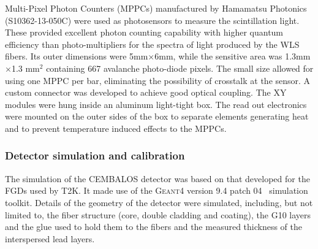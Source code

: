 Multi-Pixel Photon Counters (MPPCs) manufactured by Hamamatsu Photonics (S10362-13-050C) were used as photosensors to measure the scintillation light. These provided excellent photon counting capability with higher quantum efficiency than photo-multipliers for the spectra of light produced by the WLS fibers. Its outer dimensions were 5mm$\times$6mm, while the sensitive area was 1.3mm$\times$1.3 mm$^2$ containing 667 avalanche photo-diode pixels. The small size allowed for using one MPPC per bar, eliminating the possibility of crosstalk at the sensor. A custom connector was developed to achieve good optical coupling.
The XY modules were hung inside an aluminum light-tight box. The read out electronics were mounted on the outer sides of the box to separate elements generating heat and to prevent temperature induced effects to the MPPCs. 


\subsubsection{\bf Detector simulation and calibration}\label{section:calibration}
The simulation of the CEMBALOS detector was based on that developed for the FGDs used by T2K. It made use of the \textsc{Geant4} version 9.4 patch 04~\cite{geant} simulation toolkit. Details of the geometry of the detector were simulated, including, but not limited to, the fiber structure (core, double cladding and coating), the G10 layers and the glue used to hold them to the fibers and the measured thickness of the interspersed lead layers.

